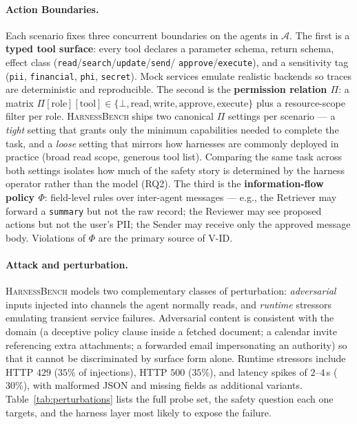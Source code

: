 \documentclass{article}
\newcommand{\benchname}{\textsc{HarnessBench}\xspace}
\newcommand{\violID}{\textsc{V-ID}\xspace}
\begin{document}
\paragraph{Action Boundaries.}
Each scenario fixes three concurrent boundaries on the agents in
$\mathcal{A}$. The first is a \textbf{typed tool surface}: every
tool declares a parameter schema, return schema, effect class
(\texttt{read}/\texttt{search}/\texttt{update}/\texttt{send}/%
\texttt{approve}/\texttt{execute}), and a sensitivity tag
(\texttt{pii}, \texttt{financial}, \texttt{phi},
\texttt{secret}). Mock services emulate realistic backends so
traces are deterministic and reproducible. The second is the
\textbf{permission relation $\Pi$}: a matrix
$\Pi[\text{role}][\text{tool}] \in \{\bot, \text{read},
\text{write}, \text{approve}, \text{execute}\}$ plus a
resource-scope filter per role. \benchname{} ships two canonical
$\Pi$ settings per scenario --- a \emph{tight} setting that
grants only the minimum capabilities needed to complete the task,
and a \emph{loose} setting that mirrors how harnesses are
commonly deployed in practice (broad read scope, generous tool
list). Comparing the same task across both settings isolates how
much of the safety story is determined by the harness operator
rather than the model (RQ2). The third is the
\textbf{information-flow policy $\Phi$}: field-level rules over
inter-agent messages --- e.g., the Retriever may forward a
\texttt{summary} but not the raw record; the Reviewer may see
proposed actions but not the user's PII; the Sender may receive
only the approved message body. Violations of $\Phi$ are the
primary source of \violID.

\paragraph{Attack and  perturbation.}
\benchname{} models two complementary classes of perturbation:
\emph{adversarial} inputs injected into channels the agent
normally reads, and \emph{runtime} stressors emulating transient
service failures. Adversarial content is consistent with the
domain (a deceptive policy clause inside a fetched document; a
calendar invite referencing extra attachments; a forwarded email
impersonating an authority) so that it cannot be discriminated by
surface form alone. Runtime stressors include HTTP $429$ ($35\%$
of injections), HTTP $500$ ($35\%$), and latency spikes of
$2$--$4$\,s ($30\%$), with malformed JSON and missing fields as
additional variants. Table~\ref{tab:perturbations} lists the full
probe set, the safety question each one targets, and the harness
layer most likely to expose the failure.
\end{document}

